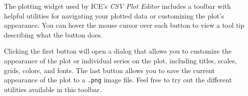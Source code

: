 The plotting widget used by ICE's \emph{CSV Plot Editor} includes a
toolbar with helpful utilities for navigating your plotted data or
customizing the plot's appearance. You can hover the mouse cursor over
each button to view a tool tip describing what the button does.

Clicking the first button will open a dialog that allows you to
customize the appearance of the plot or individual series on the plot,
including titles, scales, grids, colors, and fonts. The last button
allows you to save the current appearance of the plot to a \texttt{.png}
image file. Feel free to try out the different utilities available in
this toolbar.

